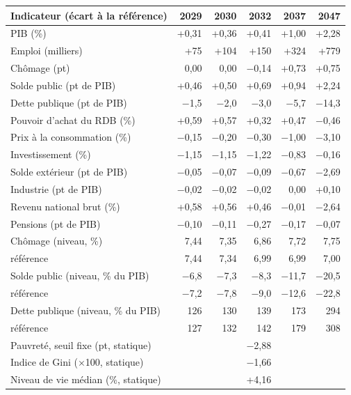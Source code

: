 \begin{tabular}{lrrrrr}
\toprule
Indicateur (écart à la référence) & 2029 & 2030 & 2032 & 2037 & 2047 \\
\midrule
PIB (\%) & +0{,}31 & +0{,}36 & +0{,}41 & +1{,}00 & +2{,}28 \\
Emploi (milliers) & +75 & +104 & +150 & +324 & +779 \\
Chômage (pt) & 0{,}00 & 0{,}00 & $-$0{,}14 & +0{,}73 & +0{,}75 \\
Solde public (pt de PIB) & +0{,}46 & +0{,}50 & +0{,}69 & +0{,}94 & +2{,}24 \\
Dette publique (pt de PIB) & $-$1{,}5 & $-$2{,}0 & $-$3{,}0 & $-$5{,}7 & $-$14{,}3 \\
Pouvoir d'achat du RDB (\%) & +0{,}59 & +0{,}57 & +0{,}32 & +0{,}47 & $-$0{,}46 \\
Prix à la consommation (\%) & $-$0{,}15 & $-$0{,}20 & $-$0{,}30 & $-$1{,}00 & $-$3{,}10 \\
Investissement (\%) & $-$1{,}15 & $-$1{,}15 & $-$1{,}22 & $-$0{,}83 & $-$0{,}16 \\
Solde extérieur (pt de PIB) & $-$0{,}05 & $-$0{,}07 & $-$0{,}09 & $-$0{,}67 & $-$2{,}69 \\
Industrie (pt de PIB) & $-$0{,}02 & $-$0{,}02 & $-$0{,}02 & 0{,}00 & +0{,}10 \\
Revenu national brut (\%) & +0{,}58 & +0{,}56 & +0{,}46 & $-$0{,}01 & $-$2{,}64 \\
Pensions (pt de PIB) & $-$0{,}10 & $-$0{,}11 & $-$0{,}27 & $-$0{,}17 & $-$0{,}07 \\
\midrule
Chômage (niveau, \%) & 7{,}44 & 7{,}35 & 6{,}86 & 7{,}72 & 7{,}75 \\
\quad référence & 7{,}44 & 7{,}34 & 6{,}99 & 6{,}99 & 7{,}00 \\
Solde public (niveau, \% du PIB) & $-$6{,}8 & $-$7{,}3 & $-$8{,}3 & $-$11{,}7 & $-$20{,}5 \\
\quad référence & $-$7{,}2 & $-$7{,}8 & $-$9{,}0 & $-$12{,}6 & $-$22{,}8 \\
Dette publique (niveau, \% du PIB) & 126 & 130 & 139 & 173 & 294 \\
\quad référence & 127 & 132 & 142 & 179 & 308 \\
\midrule
Pauvreté, seuil fixe (pt, statique) & \multicolumn{5}{c}{$-$2{,}88} \\
Indice de Gini ($\times$100, statique) & \multicolumn{5}{c}{$-$1{,}66} \\
Niveau de vie médian (\%, statique) & \multicolumn{5}{c}{+4{,}16} \\
\bottomrule
\end{tabular}
